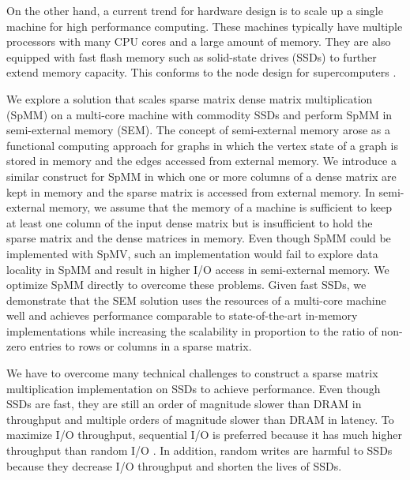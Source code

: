 
On the other hand, a current trend for hardware design is to scale up
a single machine for high performance computing.
These machines typically have multiple processors with many CPU cores and
a large amount of memory. They are also equipped with fast flash
memory such as solid-state drives (SSDs) to further extend memory capacity.
This conforms to the node design for supercomputers \cite{Ang14}.

We explore a solution that scales sparse matrix dense matrix multiplication
(SpMM) on a multi-core machine with commodity SSDs and
perform SpMM in semi-external memory (SEM). The concept of semi-external memory
arose as a functional computing approach for graphs \cite{Abello98} in which
the vertex state of a graph is stored in memory and the edges accessed from
external memory. We introduce a similar construct for SpMM in which one or more
columns of a dense matrix are kept in memory and the sparse matrix is accessed
from external memory. In semi-external memory, we assume
that the memory of a machine is sufficient to keep at least one column
of the input dense matrix but is insufficient to hold the sparse matrix
and the dense matrices in memory. Even though SpMM could be implemented with
SpMV, such an implementation would fail to explore data locality in SpMM and
result in higher I/O access in semi-external memory. We optimize SpMM directly
to overcome these problems. Given fast SSDs, we demonstrate that the SEM
solution uses the resources of a multi-core machine well and
achieves performance comparable to state-of-the-art in-memory implementations
while increasing the scalability in proportion
to the ratio of non-zero entries to rows or columns in a sparse matrix.


We have to overcome many technical challenges to construct a sparse matrix
multiplication implementation on SSDs to achieve performance. Even though SSDs
are fast, they are still an order of magnitude slower than DRAM in throughput
and multiple orders of magnitude slower than DRAM in latency.
To maximize I/O throughput, sequential I/O is preferred because it has much
higher throughput than random I/O \cite{safs}. In addition, random writes are
harmful to SSDs \cite{sfs} because
they decrease I/O throughput and shorten the lives of SSDs.

